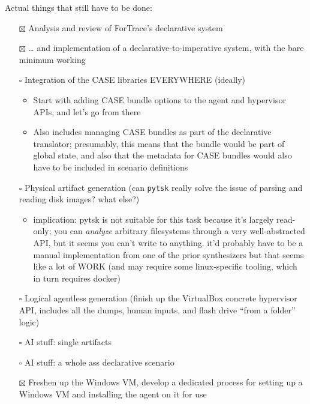 Actual things that still have to be done:

\begin{itemize}
\tightlist
\item[$\boxtimes$]
  Analysis and review of ForTrace's declarative system
\item[$\boxtimes$]
  \ldots{} and implementation of a declarative-to-imperative system,
  with the bare minimum working
\item[$\square$]
  Integration of the CASE libraries EVERYWHERE (ideally)

  \begin{itemize}
  \tightlist
  \item
    Start with adding CASE bundle options to the agent and hypervisor
    APIs, and let's go from there
  \item
    Also includes managing CASE bundles as part of the declarative
    translator; presumably, this means that the bundle would be part of
    global state, and also that the metadata for CASE bundles would also
    have to be included in scenario definitions
  \end{itemize}
\item[$\square$]
  Physical artifact generation (can \passthrough{\lstinline!pytsk!}
  really solve the issue of parsing and reading disk images? what else?)

  \begin{itemize}
  \tightlist
  \item
    implication: pytsk is not suitable for this task because it's
    largely read-only; you can \emph{analyze} arbitrary filesystems
    through a very well-abstracted API, but it seems you can't write to
    anything. it'd probably have to be a manual implementation from one
    of the prior synthesizers but that seems like a lot of WORK (and may
    require some linux-specific tooling, which in turn requires docker)
  \end{itemize}
\item[$\square$]
  Logical agentless generation (finish up the VirtualBox concrete
  hypervisor API, includes all the dumps, human inputs, and flash drive
  ``from a folder'' logic)
\item[$\square$]
  AI stuff: single artifacts
\item[$\square$]
  AI stuff: a whole ass declarative scenario
\item[$\boxtimes$]
  Freshen up the Windows VM, develop a dedicated process for setting up
  a Windows VM and installing the agent on it for use


\end{itemize}
